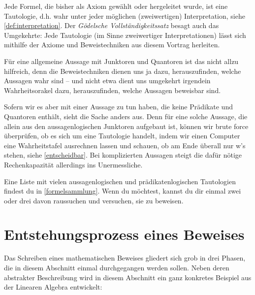 \begin{vorschau}
    Jede Formel, die bisher als Axiom gewählt oder hergeleitet wurde, ist eine Tautologie, d.h. wahr unter jeder möglichen (zweiwertigen) Interpretation, siehe \cref{def:interpretation}. Der \emph{Gödelsche Vollständigkeitssatz} besagt auch das Umgekehrte: Jede Tautologie (im Sinne zweiwertiger Interpretationen) lässt sich mithilfe der Axiome und Beweistechniken aus diesem Vortrag herleiten.
    
    Für eine allgemeine Aussage mit Junktoren und Quantoren ist das nicht allzu hilfreich, denn die Beweistechniken dienen uns ja dazu, herauszufinden, welche Aussagen wahr sind -- und nicht etwa dient uns umgekehrt irgendein Wahrheitsorakel dazu, herauszufinden, welche Aussagen beweisbar sind.
    
    Sofern wir es aber mit einer Aussage zu tun haben, die keine Prädikate und Quantoren enthält, sieht die Sache anders aus. Denn für eine solche Aussage, die allein aus den aussagenlogischen Junktoren aufgebaut ist, können wir brute force überprüfen, ob es sich um eine Tautologie handelt, indem wir einen Computer eine Wahrheitstafel ausrechnen lassen und schauen, ob am Ende überall nur w's stehen, siehe \cref{entscheidbar}. Bei komplizierten Aussagen steigt die dafür nötige Rechenkapazität allerdings ins Unermessliche.
\end{vorschau}


\begin{bem}
    Eine Liste mit vielen aussagenlogischen und prädikatenlogischen Tautologien findest du in \cref{formelsammlung}. Wenn du möchtest, kannst du dir einmal zwei oder drei davon raussuchen und versuchen, sie zu beweisen.
\end{bem}





\section{Entstehungsprozess eines Beweises}


Das Schreiben eines mathematischen Beweises gliedert sich grob in drei Phasen, die in diesem Abschnitt einmal durchgegangen werden sollen.  Neben deren abstrakter Beschreibung wird in diesem Abschnitt ein ganz konkretes Beispiel aus der Linearen Algebra entwickelt:


